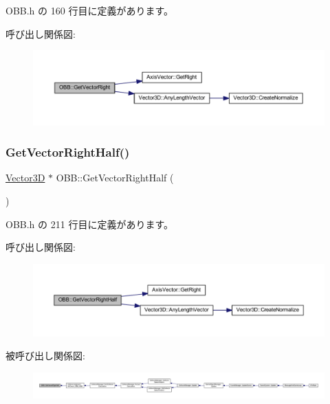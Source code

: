  O\+B\+B.\+h の 160 行目に定義があります。

呼び出し関係図\+:\nopagebreak
\begin{figure}[H]
\begin{center}
\leavevmode
\includegraphics[width=350pt]{class_o_b_b_ace28639ea3a6c38d994d82d0dd40496e_cgraph}
\end{center}
\end{figure}
\mbox{\label{class_o_b_b_a1c3a21fd4ff8dcc55d4f5d20c563ebd6}} 
\subsubsection{\texorpdfstring{Get\+Vector\+Right\+Half()}{GetVectorRightHalf()}}
{\footnotesize\ttfamily \mbox{\hyperlink{class_vector3_d}{Vector3D}} $\ast$ O\+B\+B\+::\+Get\+Vector\+Right\+Half (\begin{DoxyParamCaption}{ }\end{DoxyParamCaption})\hspace{0.3cm}{\ttfamily [inline]}}



 O\+B\+B.\+h の 211 行目に定義があります。

呼び出し関係図\+:\nopagebreak
\begin{figure}[H]
\begin{center}
\leavevmode
\includegraphics[width=350pt]{class_o_b_b_a1c3a21fd4ff8dcc55d4f5d20c563ebd6_cgraph}
\end{center}
\end{figure}
被呼び出し関係図\+:
\nopagebreak
\begin{figure}[H]
\begin{center}
\leavevmode
\includegraphics[width=350pt]{class_o_b_b_a1c3a21fd4ff8dcc55d4f5d20c563ebd6_icgraph}
\end{center}
\end{figure}
\mbox{\label{class_o_b_b_a0c0fd050224beb2c196e923e177bc0d5}} 
